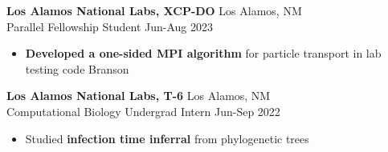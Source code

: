 \documentclass[12pt]{article}
\newcommand{\entry}[4]{{{\textbf{#1}}} \hfill #3 \\ #2 \hfill #4}
\begin{document}
\begin{minipage}[t]{0.63\textwidth}
  \medskip

  \entry{Los Alamos National Labs, XCP-DO}{Parallel Fellowship Student}{Los Alamos, NM}{Jun-Aug 2023}
  \begin{itemize}[noitemsep,rightmargin=0mm,topsep=0pt,leftmargin=.75cm]
    \item {\bf Developed a one-sided MPI algorithm} for particle transport in lab testing code Branson
  \end{itemize}

  \medskip

  \entry{Los Alamos National Labs, T-6}{Computational Biology Undergrad Intern}{Los Alamos, NM}{Jun-Sep 2022}
  \begin{itemize}[noitemsep,rightmargin=0mm,topsep=0pt,leftmargin=.75cm]
    \item Studied {\bf infection time inferral} from phylogenetic trees
  \end{itemize}
\end{minipage}%
\hspace{0.04\textwidth}%
\end{document}
